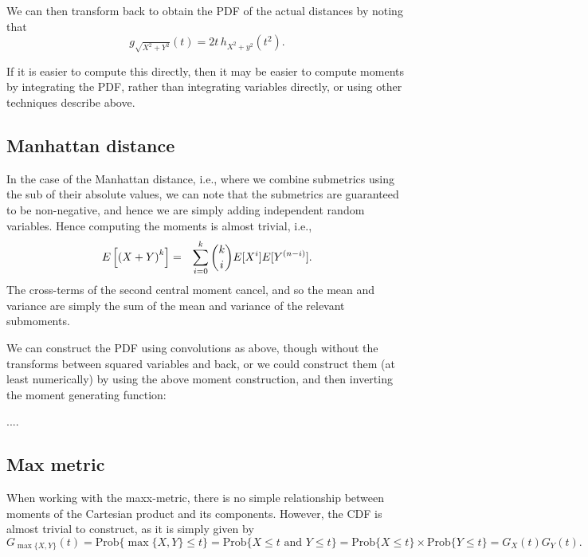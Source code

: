 \documentclass{article}
\begin{document}
We can then transform back to obtain the PDF of the actual distances
by noting that
\begin{equation}
  \label{eq:g_h}
  g_{\sqrt{X^2+Y^2}}(t) 
     =  2 t \, h_{X^2+y^2}(t^2).
\end{equation}

If it is easier to compute this directly, then it may be easier to
compute moments by integrating the PDF, rather than integrating
variables directly, or using other techniques describe above.


\subsection{Manhattan distance}

In the case of the Manhattan distance, i.e., where we combine
submetrics using the sub of their absolute values, we can note that
the submetrics are guaranteed to be non-negative, and hence we are
simply adding independent random variables. Hence computing the
moments is almost trivial, i.e., 
\begin{eqnarray}
  E\left[ \left( X + Y \right)^{k} \right] 
   & = & \sum_{i=0}^{k} \dbinom{k}{i} E[X^{i}] E[Y^{(n-i)}].
\end{eqnarray}
The cross-terms of the second central moment cancel, and so the mean
and variance are simply the sum of the mean and variance of the
relevant submoments.

We can construct the PDF using convolutions as above, though without
the transforms between squared variables and back, or we could
construct them (at least numerically) by using the above moment
construction, and then inverting the moment generating function:

....


\subsection{Max metric}

When working with the maxx-metric, there is no simple relationship
between moments of the Cartesian product and its components. However,
the CDF is almost trivial to construct, as it is simply given by
\begin{equation}
  \label{eq:cdf_construction}
  G_{\max\{X,Y\}}(t)
    = \mbox{Prob}\{ \max\{X,Y\} \leq t \}
    = \mbox{Prob}\{ X \leq t \mbox{ and } Y \leq t \}
    = \mbox{Prob}\{ X \leq t \} \times \mbox{Prob}\{ Y \leq t \}
    = G_X(t) G_Y(t). 
\end{equation}
\end{document}
